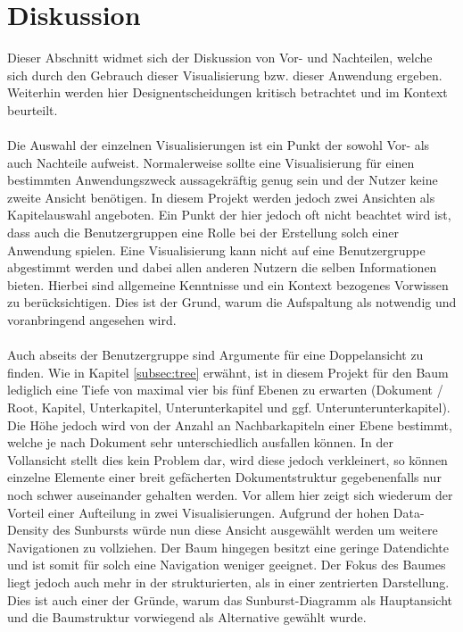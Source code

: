 \section{Diskussion}
Dieser Abschnitt widmet sich der Diskussion von Vor- und Nachteilen, welche sich durch den Gebrauch dieser Visualisierung bzw. dieser Anwendung ergeben. Weiterhin werden hier Designentscheidungen kritisch betrachtet und im Kontext beurteilt.\\
\\
Die Auswahl der einzelnen Visualisierungen ist ein Punkt der sowohl Vor- als auch Nachteile aufweist. Normalerweise sollte eine Visualisierung f\"ur einen bestimmten Anwendungszweck aussagekr\"aftig genug sein und der Nutzer keine zweite Ansicht ben\"otigen. In diesem Projekt werden jedoch zwei Ansichten als Kapitelauswahl angeboten. Ein Punkt der hier jedoch oft nicht beachtet wird ist, dass auch die Benutzergruppen eine Rolle bei der Erstellung solch einer Anwendung spielen. Eine Visualisierung kann nicht auf eine Benutzergruppe abgestimmt werden und dabei allen anderen Nutzern die selben Informationen bieten. Hierbei sind allgemeine Kenntnisse und ein Kontext bezogenes Vorwissen zu ber\"ucksichtigen. Dies ist der Grund, warum die Aufspaltung als notwendig und voranbringend angesehen wird.\\
\\
Auch abseits der Benutzergruppe sind Argumente f\"ur eine Doppelansicht zu finden. Wie in Kapitel \ref{subsec:tree} erw\"ahnt, ist in diesem Projekt f\"ur den Baum lediglich eine Tiefe von maximal vier bis f\"unf Ebenen zu erwarten (Dokument / Root, Kapitel, Unterkapitel, Unterunterkapitel und ggf. Unterunterunterkapitel). Die H\"ohe jedoch wird von der Anzahl an Nachbarkapiteln einer Ebene bestimmt, welche je nach Dokument sehr unterschiedlich ausfallen k\"onnen. In der Vollansicht stellt dies kein Problem dar, wird diese jedoch verkleinert, so k\"onnen einzelne Elemente einer breit gef\"acherten Dokumentstruktur gegebenenfalls nur noch schwer auseinander gehalten werden. Vor allem hier zeigt sich wiederum der Vorteil einer Aufteilung in zwei Visualisierungen. Aufgrund der hohen Data-Density des Sunbursts w\"urde nun diese Ansicht ausgew\"ahlt werden um weitere Navigationen zu vollziehen. Der Baum hingegen besitzt eine geringe Datendichte und ist somit f\"ur solch eine Navigation weniger geeignet. Der Fokus des Baumes liegt jedoch auch mehr in der strukturierten, als in einer zentrierten Darstellung. Dies ist auch einer der Gr\"unde, warum das Sunburst-Diagramm als Hauptansicht und die Baumstruktur vorwiegend als Alternative gew\"ahlt wurde.\\
